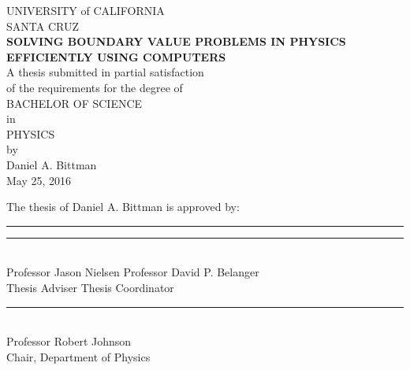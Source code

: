 \documentclass[12pt]{article}
\begin{document}

\begin{center}

	UNIVERSITY of CALIFORNIA\\
	\vspace{2mm}
	SANTA CRUZ\\
	\vspace{10mm}
	{\large\textbf{\textsc{SOLVING BOUNDARY VALUE PROBLEMS IN PHYSICS\\EFFICIENTLY USING COMPUTERS}}}\\
	\vspace{10mm}
	A thesis submitted in partial satisfaction\\of the requirements for the degree of\\
	\vspace{5mm}
	\textsc{BACHELOR OF SCIENCE}\\
	\vspace{3mm}
	in\\
	\vspace{3mm}
	\textsc{PHYSICS}\\
	\vspace{5mm}
	by\\
	\vspace{2mm}
	Daniel A. Bittman\\
	May 25, 2016\\

	\vspace{2in}

	The thesis of Daniel A. Bittman is approved by:\\
	\vspace{1in}

	\rule{2.5in}{2pt}\hfill
	\rule{2.5in}{2pt} \\
	Professor Jason Nielsen \hfill Professor David P. Belanger\\
	Thesis Adviser \hfill Thesis Coordinator\\

	\vspace{15mm}
	\rule{2.5in}{2pt}\\
	Professor Robert Johnson\\
	Chair, Department of Physics

\end{center}

\clearpage
\setcounter{page}{1}
\renewcommand{\thepage}{\roman{page}}
\end{document}
